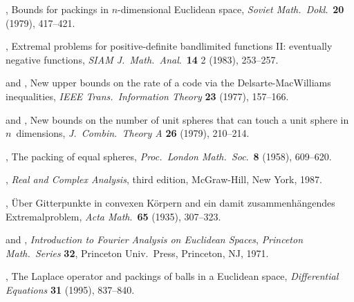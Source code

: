\begin{references}
 ,  Bounds for packings in
$n$-dimensional Euclidean space, {\it Soviet Math.\ Dokl\/}.\
{\bf 20} (1979), 417--421.

 , Extremal problems for
positive-definite bandlimited functions II: eventually negative
functions, {\it SIAM J.\ Math.\ Anal\/}.\  {\bf 14} 2 (1983), 253--257.

 
and
, New upper bounds on the rate of a code via
the Delsarte-MacWilliams inequalities, {\it IEEE Trans.\
Information Theory\/} {\bf 23} (1977), 157--166.

  and , New bounds
on the number of unit spheres that can touch a unit sphere in
$n$~dimensions, {\it J.\ Combin.\ Theory  A\/} {\bf 26}
(1979), 210--214.

 , The packing of equal spheres,
{\it Proc.\  London Math.\  Soc\/}.\  {\bf 8} (1958),
609--620.

 , {\it Real and Complex Analysis\/},
third edition, McGraw-Hill, New York, 1987.

 , \"Uber Gitterpunkte in convexen
K\"orpern and ein damit zusammenh\"angendes Extremalproblem,
{\it Acta Math\/}.\  {\bf 65} (1935), 307--323.

  and ,
{\it Introduction to Fourier Analysis on Euclidean Spaces},
{\it Princeton Math.\  Series\/} {\bf 32}, Princeton Univ.\  Press,
Princeton, NJ, 1971.

 , The Laplace operator and  packings
of balls  in a Euclidean space, {\it Differential Equations\/} {\bf 31}
 (1995), 837--840.
\end{references}


